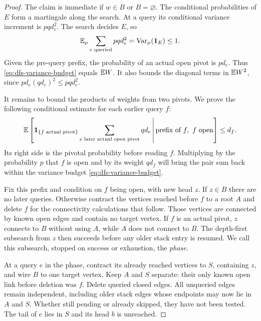 \begin{proof}
The claim is immediate if $w\in B$ or $B=\varnothing$.
The conditional probabilities of $E$ form a martingale along the
search. At a query its conditional variance increment is $pq d_e^2$.
The search decides $E$, so
\begin{equation}\label{eq:dfs-variance-budget}
 \mathbb E_\mu\sum_{e\text{ queried}}pq d_e^2
 =\operatorname{Var}_\mu(\mathbf1_E)\le1.
\end{equation}
Given the pre-query prefix, the probability of an actual open pivot is
$p d_e$. Thus \eqref{eq:dfs-variance-budget} equals $\mathbb E W$.
It also bounds the diagonal terms in $\mathbb E W^2$, since
$p d_e(qd_e)^2\le pq d_e^2$.

It remains to bound the products of weights from two pivots. We prove
the following conditional estimate for each earlier query $f$:
\begin{equation}\label{eq:dfs-future-pair-bound}
 \mathbb E\left[
 \mathbf1_{\{f\text{ actual pivot}\}}
 \sum_{e\text{ later actual open pivot}}q d_e
 \,\middle|\,\text{prefix of }f,\ f\text{ open}\right]\le d_f.
\end{equation}
Its right side is the pivotal probability before reading $f$.
Multiplying by the probability $p$ that $f$ is open and by its weight
$qd_f$ will bring the pair sum back within the variance budget
\eqref{eq:dfs-variance-budget}.

Fix this prefix and condition on $f$ being open, with new head $z$.
If $z\in B$ there are no later queries. Otherwise contract the vertices
reached before $f$ to a root $A$ and delete $f$ for the connectivity
calculations that follow. Those vertices are connected by known open
edges and contain no target vertex. If $f$ is an actual pivot, $z$
connects to $B$ without using $A$, while $A$ does not connect to $B$.
The depth-first subsearch from $z$ then succeeds before any older stack
entry is resumed. We call this subsearch, stopped on success or
exhaustion, the \emph{phase}.

At a query $e$ in the phase, contract its already reached vertices to
$S$, containing $z$, and wire $B$ to one target vertex. Keep $A$ and
$S$ separate: their only known open link before deletion was $f$.
Delete queried closed edges. All unqueried edges remain independent,
including older stack edges whose endpoints may now lie in $A$ and
$S$. Whether still pending or already skipped, they have not been tested.
The tail of $e$ lies
in $S$ and its head $b$ is unreached.


\end{proof}
